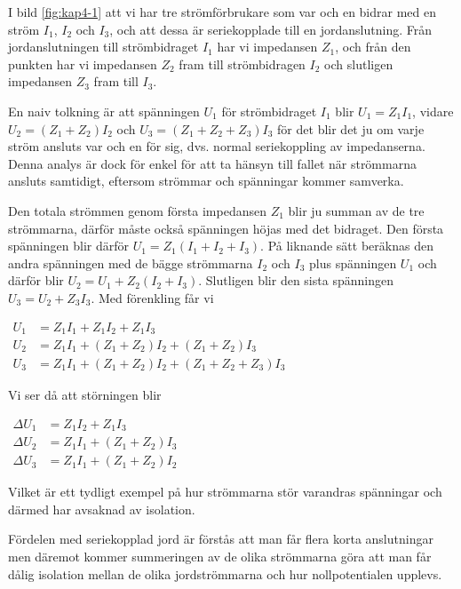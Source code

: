 I bild \ref{fig:kap4-1} att vi har tre strömförbrukare som var och en
bidrar med en ström \(I_1\), \(I_2\) och \(I_3\), och att dessa är
seriekopplade till en jordanslutning.
Från jordanslutningen till strömbidraget \(I_1\) har vi impedansen \(Z_1\),
och från den punkten har vi impedansen \(Z_2\) fram till strömbidragen \(I_2\)
och slutligen impedansen \(Z_3\) fram till \(I_3\).

En naiv tolkning är att spänningen \(U_1\) för strömbidraget \(I_1\) blir
\(U_1 = Z_1 I_1\), vidare \(U_2 = (Z_1 + Z_2) I_2\) och
\(U_3 = (Z_1 + Z_2 + Z_3) I_3\) för det blir det ju om varje ström ansluts var
och en för sig, dvs. normal seriekoppling av impedanserna.
Denna analys är dock för enkel för att ta hänsyn till fallet när strömmarna
ansluts samtidigt, eftersom strömmar och spänningar kommer samverka.

Den totala strömmen genom första impedansen \(Z_1\) blir ju summan av de tre
strömmarna, därför måste också spänningen höjas med det bidraget.
Den första spänningen blir därför \(U_1=Z_1 (I_1 + I_2 + I_3)\).
På liknande sätt beräknas den andra spänningen med de bägge strömmarna \(I_2\)
och \(I_3\) plus spänningen \(U_1\) och därför blir
\(U_2 = U_1 + Z_2 (I_2 + I_3)\).
Slutligen blir den sista spänningen \(U_3 = U_2 + Z_3 I_3\).
Med förenkling får vi

\(
\begin{array}{ll}
U_1 & = Z_1 I_1 + Z_1 I_2 + Z_1 I_3 \\
U_2 & = Z_1 I_1 + (Z_1 + Z_2) I_2 + (Z_1 + Z_2) I_3 \\
U_3 & = Z_1 I_1 + (Z_1 + Z_2) I_2 + (Z_1 + Z_2 + Z_3) I_3
\end{array}
\)

Vi ser då att störningen blir

\(
\begin{array}{ll}
\Delta U_1 & =  Z_1 I_2 + Z_1 I_3 \\
\Delta U_2 & = Z_1 I_1 + (Z_1 + Z_2) I_3 \\
\Delta U_3 & = Z_1 I_1 + (Z_1 + Z_2) I_2
\end{array}
\)

Vilket är ett tydligt exempel på hur strömmarna stör varandras spänningar och
därmed har avsaknad av isolation.

Fördelen med seriekopplad jord är förstås att man får flera korta anslutningar
men däremot kommer summeringen av de olika strömmarna göra att man får dålig
isolation mellan de olika jordströmmarna och hur nollpotentialen upplevs.

